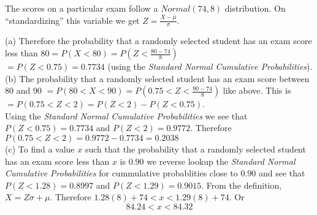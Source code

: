 \documentclass[boxes, qed]{homework}
\begin{document}
\begin{problem}The scores on a particular exam follow a $Normal(74, 8)$ distribution.
  On ``standardizing'' this variable we get
  $Z=\frac{X-\mu}{\sigma}$.
\end{problem}
\begin{solution}(a) Therefore the probability that a randomly selected student 
  has an exam score less than $80 = P(X<80) = P(Z<\frac{80-74}{8})$\\
  $=P(Z<0.75) = \boxed{0.7734}$ (using the \textit{Standard Normal Cumulative Probabilities}).\\

  (b) The probability that a randomly selected student 
  has an exam score between 80 and 90
  $=P(80 < X < 90) = P(0.75 < Z < \frac{90-74}{8})$ like above.
  This is $=P(0.75 < Z < 2) = P(Z < 2) - P(Z < 0.75)$.\\
  Using the \textit{Standard Normal Cumulative Probabilities} we see that
  $P(Z < 0.75) = 0.7734$ and $P(Z < 2) = 0.9772$. Therefore
  $P(0.75 < Z < 2) = 0.9772 - 0.7734 = \boxed{0.2038}$\\

  (c) To find a value $x$ such that the probability that 
  a randomly selected student has an exam
  score less than $x$ is $0.90$ we reverse lookup
  the \textit{Standard Normal Cumulative Probabilities}
  for cummulative probablities close to $0.90$ and see that\\

  $P(Z<1.28) = 0.8997$ and $P(Z<1.29) = 0.9015$.
  From the definition, $X=Z\sigma + \mu$. Therefore
  $1.28(8)+74<x<1.29(8)+74$. Or
  $$84.24<x<84.32$$
\end{solution}
\end{document}
